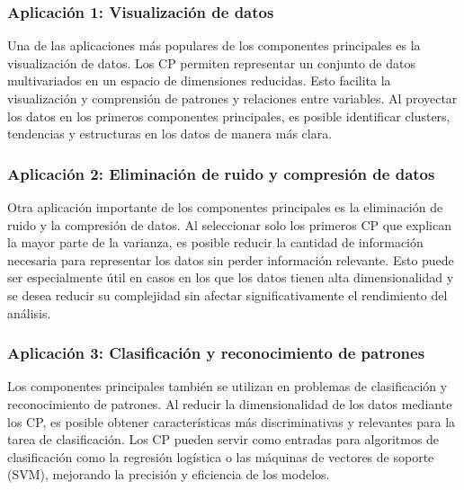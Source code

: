 \documentclass{article}
\begin{document}
\subsubsection{Aplicación 1: Visualización de datos}
Una de las aplicaciones más populares de los componentes principales es la visualización de datos. Los CP permiten representar un conjunto de datos multivariados en un espacio de dimensiones reducidas. Esto facilita la visualización y comprensión de patrones y relaciones entre variables. Al proyectar los datos en los primeros componentes principales, es posible identificar clusters, tendencias y estructuras en los datos de manera más clara.

\subsubsection{Aplicación 2: Eliminación de ruido y compresión de datos}
Otra aplicación importante de los componentes principales es la eliminación de ruido y la compresión de datos. Al seleccionar solo los primeros CP que explican la mayor parte de la varianza, es posible reducir la cantidad de información necesaria para representar los datos sin perder información relevante. Esto puede ser especialmente útil en casos en los que los datos tienen alta dimensionalidad y se desea reducir su complejidad sin afectar significativamente el rendimiento del análisis.

\subsubsection{Aplicación 3: Clasificación y reconocimiento de patrones}
Los componentes principales también se utilizan en problemas de clasificación y reconocimiento de patrones. Al reducir la dimensionalidad de los datos mediante los CP, es posible obtener características más discriminativas y relevantes para la tarea de clasificación. Los CP pueden servir como entradas para algoritmos de clasificación como la regresión logística o las máquinas de vectores de soporte (SVM), mejorando la precisión y eficiencia de los modelos.

\end{document}
